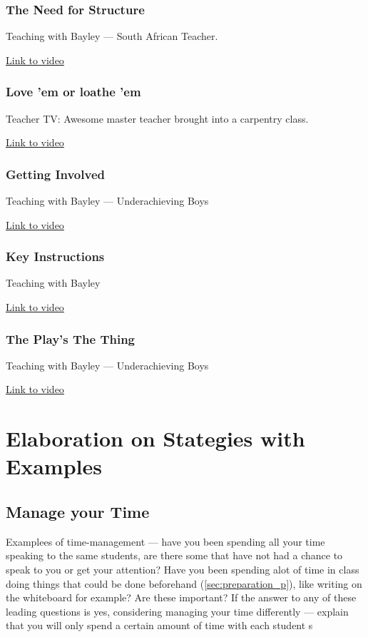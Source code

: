 \documentclass[12pt]{report}
\begin{document}
\begin{appendices}
\subsection{The Need for Structure}

Teaching with Bayley --- South African Teacher.
 
\href{http://archive.teachfind.com/ttv/www.teachers.tv/videos/the-need-for-structure.html}{Link to video}

\subsection{Love 'em or loathe 'em}

Teacher TV: Awesome master teacher brought into a carpentry class.

\href{https://www.youtube.com/watch?v=YUo61Uj4Cmg}{Link to video}

\subsection{Getting Involved}

Teaching with Bayley --- Underachieving Boys

\href{https://www.youtube.com/watch?v=42p59Upj_M4}{Link to video}


\subsection{Key Instructions}

Teaching with Bayley

\href{https://www.youtube.com/watch?v=FP7GyfGKamQ}{Link to video}


\subsection{The Play's The Thing}

Teaching with Bayley --- Underachieving Boys

\href{https://www.youtube.com/watch?v=9196qkVWaLw}{Link to video}




\chapter{Elaboration on Stategies with Examples}

\section{Manage your Time}
Examplees of time-management --- have you been spending all your time speaking to the same students, are there some that have not had a chance to speak to you or get your attention? Have you been spending alot of time in class doing things that could be done beforehand (\ref{sec:preparation_p}), like writing on the whiteboard for example? Are these important? If the answer to any of these leading questions is yes, considering managing your time differently --- explain that you will only spend a certain amount of time with each student s


\end{appendices}
\end{document}

